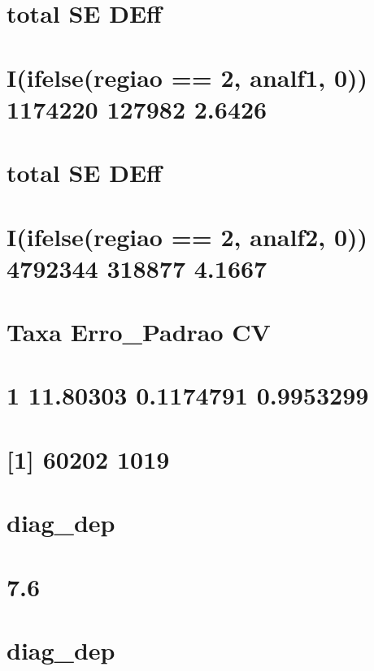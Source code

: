 \documentclass[]{book}
\theoremstyle{definition}
\theoremstyle{definition}
\theoremstyle{definition}
\theoremstyle{remark}
\begin{document}
\section{total SE DEff}\label{total-se-deff-4}

\section{I(ifelse(regiao == 2, analf1, 0)) 1174220 127982
2.6426}\label{iifelseregiao-2-analf1-0-1174220-127982-2.6426}

\section{total SE DEff}\label{total-se-deff-5}

\section{I(ifelse(regiao == 2, analf2, 0)) 4792344 318877
4.1667}\label{iifelseregiao-2-analf2-0-4792344-318877-4.1667}

\section{Taxa Erro\_Padrao CV}\label{taxa-erro_padrao-cv}

\section{1 11.80303 0.1174791 0.9953299}\label{section-4}

\section{{[}1{]} 60202 1019}\label{section-5}

\section{diag\_dep}\label{diag_dep}

\section{7.6}\label{section-6}

\section{diag\_dep}\label{diag_dep-1}
\end{document}
